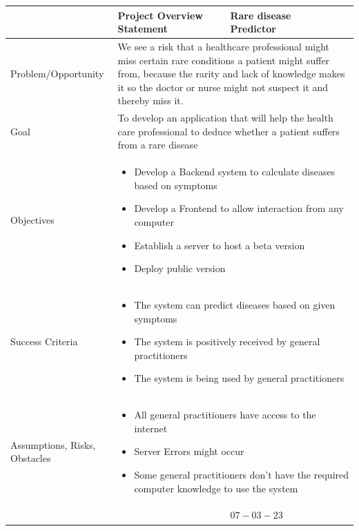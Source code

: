 \begin{center}
	\begin{tabular}[h]{|p{7em}|p{5em}|p{5em}|p{5em}|p{5em}|}
		\hline
		& {\scriptsize Project Overview Statement} & {\scriptsize Rare disease Predictor} & & {\scriptsize } \\ \hline
		{\scriptsize Problem/Opportunity} & \multicolumn{4}{|p{20em}|}{\scriptsize We see a risk that a healthcare professional might miss certain rare conditions a patient might suffer from, because the rarity and lack of knowledge makes it so the doctor or nurse might not suspect it and thereby miss it.}\\ \hline
		{\scriptsize Goal} & \multicolumn{4}{|p{20em}|}{\scriptsize To develop an application that will help the health care professional to deduce whether a patient suffers from a rare disease}\\ \hline
		{\scriptsize Objectives} & \multicolumn{4}{|p{20em}|}{\scriptsize \begin{itemize}
		\item Develop a Backend system to calculate diseases based on symptoms
		\item Develop a Frontend to allow interaction from any computer
		\item Establish a server to host a beta version
		\item Deploy public version
			 \end{itemize}
		 } \\ \hline
	 {\scriptsize Success Criteria} & \multicolumn{4}{|p{20em}|}{\scriptsize\begin{itemize}
	 	\item The system can predict diseases based on given symptoms
	 	\item The system is positively received by general practitioners
	 	\item The system is being used by general practitioners
	 \end{itemize}} \\ \hline
 	{\scriptsize Assumptions, Risks, Obstacles} & \multicolumn{4}{|p{20em}|}{\scriptsize
 	\begin{itemize}
 		\item All general practitioners have access to the internet
 		\item Server Errors might occur
 		\item Some general practitioners don't have the required computer knowledge to use the system
 	\end{itemize}	
 }\\ \hline
& {\scriptsize } & {\scriptsize $07-03-23$} & & \\ \hline
	\end{tabular}
\end{center}
